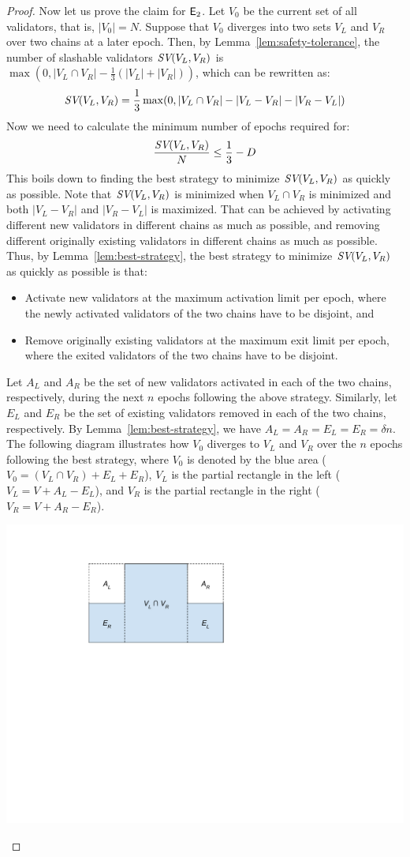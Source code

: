 \begin{proof}
Now let us prove the claim for $\mathsf{E}_2$.
Let $V_0$ be the current set of all validators, that is, $|V_0| = N$.
Suppose that $V_0$ diverges into two sets $V_L$ and $V_R$ over two chains at a later epoch.
Then, by Lemma~\ref{lem:safety-tolerance}, the number of slashable validators $\textit{SV}(V_L,V_R)$ is $\max(0, |V_L \cap V_R| - \frac{1}{3} (|V_L| + |V_R|))$, which can be rewritten as:
\[
\textit{SV}(V_L,V_R) = \frac{1}{3} \max(0, |V_L \cap V_R| - |V_L-V_R| - |V_R-V_L|)
\]
Now we need to calculate the minimum number of epochs required for:
\begin{equation}\label{eq:st-le-d}
\frac{\textit{SV}(V_L,V_R)}{N} \le \frac{1}{3} - D
\end{equation}
This boils down to finding the best strategy to minimize $\textit{SV}(V_L,V_R)$ as quickly as possible.
Note that $\textit{SV}(V_L,V_R)$ is minimized when $V_L \cap V_R$ is minimized and both $|V_L-V_R|$ and $|V_R-V_L|$ is maximized.
That can be achieved by activating different new validators in different chains as much as possible, and removing different originally existing validators in different chains as much as possible.
Thus, by Lemma~\ref{lem:best-strategy}, the best strategy to minimize $\textit{SV}(V_L,V_R)$ as quickly as possible is that:
\begin{itemize}
\item Activate new validators at the maximum activation limit per epoch, where the newly activated validators of the two chains have to be disjoint, and
\item Remove originally existing validators at the maximum exit limit per epoch, where the exited validators of the two chains have to be disjoint.
\end{itemize}
Let $A_L$ and $A_R$ be the set of new validators activated in each of the two chains, respectively, during the next $n$ epochs following the above strategy.
Similarly, let $E_L$ and $E_R$ be the set of existing validators removed in each of the two chains, respectively.
By Lemma~\ref{lem:best-strategy}, we have $A_L = A_R = E_L = E_R = \delta n$.
The following diagram illustrates how $V_0$ diverges to $V_L$ and $V_R$ over the $n$ epochs following the best strategy, where $V_0$ is denoted by the blue area ($V_0 = (V_L \cap V_R) + E_L + E_R$), $V_L$ is the partial rectangle in the left ($V_L = V + A_L - E_L$), and $V_R$ is the partial rectangle in the right ($V_R = V + A_R - E_R$).
\begin{center}
\includegraphics[width=.5\columnwidth]{after-n-epoch.pdf}

\end{center}
\end{proof}

